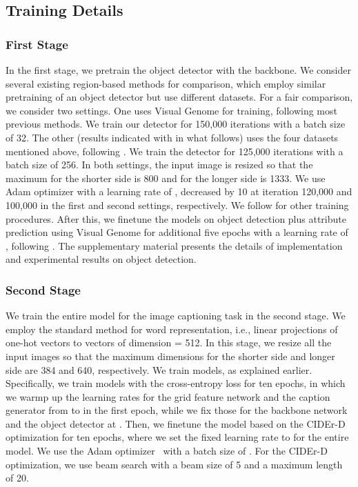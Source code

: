 \documentclass[runningheads]{llncs}
\begin{document}
\subsection{Training Details}

\subsubsection{First Stage}
In the first stage, we pretrain the object detector with the backbone. We consider several existing region-based methods for comparison, which employ similar pretraining of an object detector but use different datasets. For a fair comparison, we consider two settings. One uses Visual Genome for training, following most previous methods. We train our detector for 150,000 iterations with a batch size of 32. The other (results indicated with  in what follows) uses the four datasets mentioned above,  following \cite{zhang2021vinvl}. We train the detector for 125,000 iterations with a batch size of 256. In both settings, the input image is resized so that the maximum for the shorter side is 800 and for the longer side is 1333. We use Adam optimizer \cite{kingma2015adam} with a learning rate of , decreased by 10 at iteration 120,000 and 100,000 in the first and second settings, respectively. We follow \cite{zhu2021deformable} for other training procedures. After this, we finetune the models on object detection plus attribute prediction using Visual Genome for additional five epochs with a learning rate of , following \cite{anderson2018bottom,zhang2021vinvl}. The supplementary material presents the details of implementation and experimental results on object detection. 


\subsubsection{Second Stage}
We train the entire model for the image captioning task in the second stage. We employ the standard method for word representation, i.e., linear projections of one-hot vectors to vectors of dimension  = 512.  
In this stage, we resize all the input images so that the maximum dimensions for the shorter side and longer side are 384 and 640, respectively. We train models, as explained earlier. Specifically, we train models with the cross-entropy loss  for ten epochs, in which we warmp up the learning rates for the grid feature network and the caption generator from  to  in the first epoch, while we fix those for the backbone network and the object detector at . Then, we finetune the model based on the CIDEr-D optimization for ten epochs, where we set the fixed learning rate to  for the entire model.
We use the Adam optimizer~\cite{kingma2015adam} with a batch size of . For the CIDEr-D optimization, we use beam search with a beam size of 5 and a maximum length of 20. 
\end{document}
